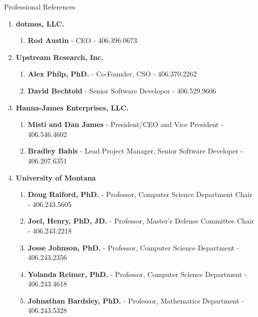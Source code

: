 \documentclass[oneside]{article}%
\begin{document}
\newpage
\noindent
\huge{Professional References}\\
\small
\begin{enumerate}[]
	\item \large \textbf{dotmos, LLC.} \small
		\begin{enumerate}[]
			\item \textbf{Rod Austin} - CEO - 406.396.0673
		\end{enumerate}
	\item \large \textbf{Upstream Research, Inc.} \small
		\begin{enumerate}[]
			\item \textbf{Alex Philp, PhD.} - Co-Founder, CSO - 406.370.2262
			\item \textbf{David Bechtold} - Senior Software Developer - 406.529.9606
		\end{enumerate}
	\item \large \textbf{Hanna-James Enterprises, LLC.} \small
		\begin{enumerate}[]
			\item \textbf{Misti and Dan James} - President/CEO and Vice President - 406.546.4602
			\item \textbf{Bradley Bahls} - Lead Project Manager, Senior Software Developer - 406.207.6351
		\end{enumerate}
	\item \large \textbf{University of Montana} \small
		\begin{enumerate}[]
			\item \textbf{Doug Raiford, PhD.} - Professor, Computer Science Department Chair - 406.243.5605
			\item \textbf{Joel, Henry, PhD, JD.} - Professor, Master's Defense Committee Chair - 406.243.2218
			\item \textbf{Jesse Johnson, PhD.} - Professor, Computer Science Department - 406.243.2356
			\item \textbf{Yolanda Reimer, PhD.} - Professor, Computer Science Department - 406.243.4618
			\item \textbf{Johnathan Bardsley, PhD.} - Professor, Mathematics Department - 406.243.5328
		\end{enumerate}
\end{enumerate}
\end{document}
